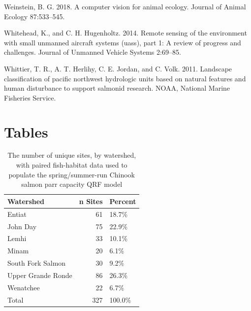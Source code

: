 \documentclass[
  12pt,
]{article}
\begin{document}
\leavevmode\hypertarget{ref-Weinstein2018}{}%
Weinstein, B. G. 2018. A computer vision for animal ecology. Journal of Animal Ecology 87:533--545.

\leavevmode\hypertarget{ref-Whitehead2014}{}%
Whitehead, K., and C. H. Hugenholtz. 2014. Remote sensing of the environment with small unmanned aircraft systems (uass), part 1: A review of progress and challenges. Journal of Unmanned Vehicle Systems 2:69--85.

\leavevmode\hypertarget{ref-Whittier2011}{}%
Whittier, T. R., A. T. Herlihy, C. E. Jordan, and C. Volk. 2011. Landscape classification of pacific northwest hydrologic units based on natural features and human disturbance to support salmonid research. NOAA, National Marine Fisheries Service.

\newpage

\hypertarget{tables}{%
\section{Tables}\label{tables}}

\hypertarget{tables}{}

\begin{table}[!h]

\caption{\label{tab:fish-hab-sites}The number of unique sites, by watershed, with paired fish-habitat data used to populate the spring/summer-run Chinook salmon parr capacity QRF model}
\centering
\begin{tabular}[t]{lrl}
\toprule
Watershed & n Sites & Percent\\
\midrule
Entiat & 61 & 18.7\%\\
John Day & 75 & 22.9\%\\
Lemhi & 33 & 10.1\%\\
Minam & 20 & 6.1\%\\
South Fork Salmon & 30 & 9.2\%\\
Upper Grande Ronde & 86 & 26.3\%\\
Wenatchee & 22 & 6.7\%\\
Total & 327 & 100.0\%\\
\bottomrule
\end{tabular}
\end{table}

\newpage
\end{document}
